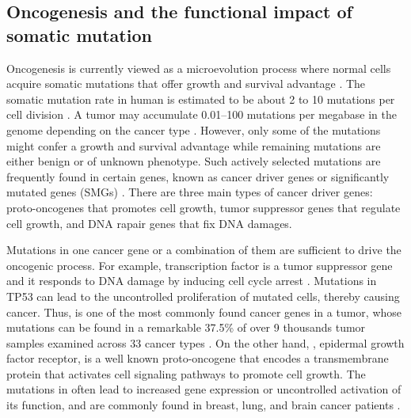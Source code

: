 \subsection{Oncogenesis and the functional impact of somatic mutation}
Oncogenesis is currently viewed as a microevolution process where normal cells acquire somatic mutations that offer growth and survival advantage \cite{strattonmr_futrealpa:CancerGenome2009,martincorenai_campbellpj:SomaticMutation2015}. The somatic mutation rate in human is estimated to be about 2 to 10 mutations per cell division \cite{lynchm_lynchm:RateMolecular2010,milhollandb_vijgj:DifferencesGermline2017}. A tumor may accumulate 0.01--100 mutations per megabase in the genome depending on the cancer type \cite{lawrencems_getzg:MutationalHeterogeneity2013,martincorenai_campbellpj:SomaticMutation2015}. However, only some of the mutations might confer a growth and survival advantage while remaining mutations are either benign or of unknown phenotype. Such actively selected mutations are frequently found in certain genes, known as cancer driver genes or significantly mutated genes (SMGs) \cite{dingl_mariamidzea:PerspectiveOncogenic2018}. There are three main types of cancer driver genes: proto-oncogenes that promotes cell growth, tumor suppressor genes that regulate cell growth, and DNA rapair genes that fix DNA damages.

Mutations in one cancer gene or a combination of them are sufficient to drive the oncogenic process. For example, transcription factor  is a tumor suppressor gene\footnotemark{} and it responds to DNA damage by inducing cell cycle arrest \cite{kastanmb_craigrw:ParticipationP531991}. Mutations in TP53 can lead to the uncontrolled proliferation of mutated cells, thereby causing cancer. Thus,  is one of the most commonly found cancer genes in a tumor, whose mutations can be found in a remarkable 37.5\% of over 9 thousands tumor samples examined across 33 cancer types \cite{baileymh_dingl:ComprehensiveCharacterization2018}. On the other hand, , epidermal growth factor receptor, is a well known proto-oncogene that encodes a transmembrane protein that activates cell signaling pathways to promote cell growth. The mutations in  often lead to increased gene expression or uncontrolled activation of its function, and are commonly found in breast, lung, and brain cancer patients \cite{ciardiellof_tortorag:EGFRAntagonists2008}.


